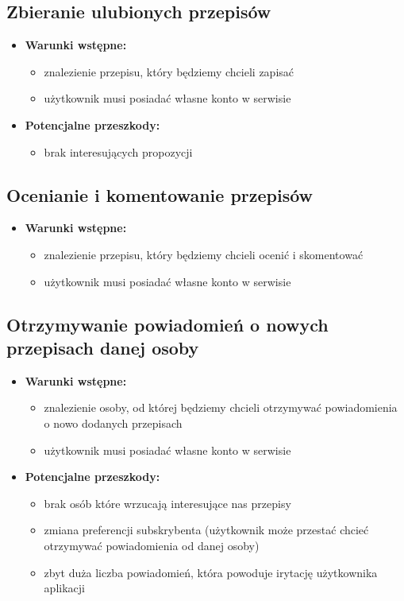 \documentclass{article}
\begin{document}
\subsection{Zbieranie ulubionych przepisów}
  \begin{itemize}
    \item \textbf{Warunki wstępne:}
      \begin{itemize}
        \item znalezienie przepisu, który będziemy chcieli zapisać
        \item użytkownik musi posiadać własne konto w serwisie
      \end{itemize}
    \item \textbf{Potencjalne przeszkody:}
      \begin{itemize}
        \item brak interesujących propozycji
      \end{itemize}
  \end{itemize}
\subsection{Ocenianie i komentowanie przepisów}
  \begin{itemize}
    \item \textbf{Warunki wstępne:}
      \begin{itemize}
        \item znalezienie przepisu, który będziemy chcieli ocenić i skomentować
        \item użytkownik musi posiadać własne konto w serwisie
      \end{itemize}
  \end{itemize}
\subsection{Otrzymywanie powiadomień o nowych przepisach danej osoby}
  \begin{itemize}
    \item \textbf{Warunki wstępne:}
      \begin{itemize}
        \item znalezienie osoby, od której będziemy chcieli otrzymywać powiadomienia o nowo dodanych przepisach
        \item użytkownik musi posiadać własne konto w serwisie
      \end{itemize}
    \item \textbf{Potencjalne przeszkody:}
      \begin{itemize}
        \item brak osób które wrzucają interesujące nas przepisy 
        \item zmiana preferencji subskrybenta (użytkownik może przestać chcieć otrzymywać powiadomienia od danej osoby)
        \item zbyt duża liczba powiadomień, która powoduje irytację użytkownika aplikacji
      \end{itemize}
  \end{itemize}
\end{document}

